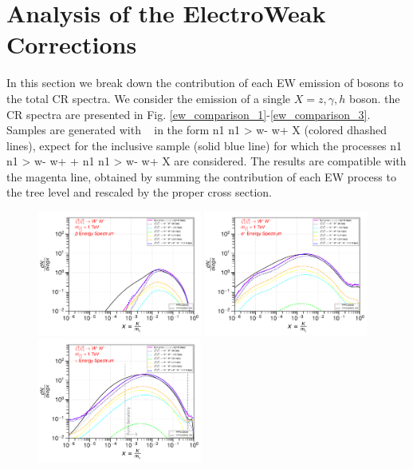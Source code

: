 \documentclass[epj,nopacs,fleqn]{svjour}
\begin{document}
\section{Analysis of the ElectroWeak Corrections}
In this section we break down the contribution of each EW emission of bosons to the total CR spectra. We consider the emission of a single $X=z,\gamma,h$ boson. the CR spectra are presented in Fig. \ref{ew_comparison_1}-\ref{ew_comparison_3}. Samples are generated with \MG~ in the form n1 n1 > w- w+ X (colored dhashed lines), expect for the inclusive sample (solid blue line) for which the processes n1 n1 > w- w+ + n1 n1 > w- w+ X  are considered. The results are compatible with the magenta line, obtained by summing the contribution of each EW process to the tree level and rescaled by the proper cross section. 
\begin{figure}[!h]
	\centering
	\subfigure
	{ \includegraphics[width=0.48\textwidth]{Fig/n1ww_comparison/1000.0_antiprotons_n1ww_comparison_1000.0.pdf} } 
	\subfigure
	{\includegraphics[width=0.48\textwidth]{Fig/n1ww_comparison/1000.0_positrons_n1ww_comparison_1000.0.pdf} }
	\subfigure
	{\includegraphics[width=0.48\textwidth]{Fig/n1ww_comparison/1000.0_gammas_n1ww_comparison_1000.0.pdf} }

\end{figure}
\end{document}
